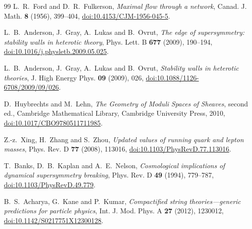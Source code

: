 \begin{thebibliography}{99}
L.~R.~Ford and D.~R.~Fulkerson,
\emph{Maximal flow through a network},
Canad. J. Math. \textbf{8} (1956), 399--404,
\href{https://doi.org/10.4153/CJM-1956-045-5}{doi:10.4153/CJM-1956-045-5}.

L.~B.~Anderson, J.~Gray, A.~Lukas and B.~Ovrut,
\emph{The edge of supersymmetry: stability walls in heterotic theory},
Phys. Lett. B \textbf{677} (2009), 190--194,
\href{https://doi.org/10.1016/j.physletb.2009.05.025}{doi:10.1016/j.physletb.2009.05.025}.

L.~B.~Anderson, J.~Gray, A.~Lukas and B.~Ovrut,
\emph{Stability walls in heterotic theories},
J. High Energy Phys. \textbf{09} (2009), 026,
\href{https://doi.org/10.1088/1126-6708/2009/09/026}{doi:10.1088/1126-6708/2009/09/026}.

D.~Huybrechts and M.~Lehn, \emph{The Geometry of Moduli Spaces of
Sheaves}, second ed., Cambridge Mathematical Library, Cambridge University
Press, 2010,
\href{https://doi.org/10.1017/CBO9780511711985}{doi:10.1017/CBO9780511711985}.

Z.-z.~Xing, H.~Zhang and S.~Zhou,
\emph{Updated values of running quark and lepton masses},
Phys. Rev. D \textbf{77} (2008), 113016,
\href{https://doi.org/10.1103/PhysRevD.77.113016}{doi:10.1103/PhysRevD.77.113016}.

T.~Banks, D.~B.~Kaplan and A.~E.~Nelson,
\emph{Cosmological implications of dynamical supersymmetry breaking},
Phys. Rev. D \textbf{49} (1994), 779--787,
\href{https://doi.org/10.1103/PhysRevD.49.779}{doi:10.1103/PhysRevD.49.779}.

B.~S.~Acharya, G.~Kane and P.~Kumar,
\emph{Compactified string theories---generic predictions for particle
physics}, Int. J. Mod. Phys. A \textbf{27} (2012), 1230012,
\href{https://doi.org/10.1142/S0217751X12300128}{doi:10.1142/S0217751X12300128}.

\end{thebibliography}
